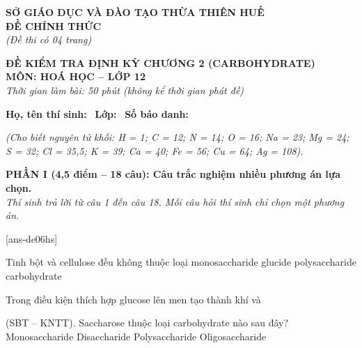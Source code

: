 \documentclass[12pt,a4paper]{article}
\begin{document}
\thispagestyle{firstpage}

\noindent
\begin{minipage}[t]{0.44\textwidth}
	\centering\fontsize{10pt}{12pt}\selectfont
	\textbf{SỞ GIÁO DỤC VÀ ĐÀO TẠO THỪA THIÊN HUẾ}\\
	\textbf{ĐỀ CHÍNH THỨC}\\
	\textit{(Đề thi có 04 trang)}
\end{minipage}\hfill
\begin{minipage}[t]{0.54\textwidth}
	\centering\small
	\textbf{ĐỀ KIỂM TRA ĐỊNH KỲ CHƯƠNG 2 (CARBOHYDRATE)}\\
	\textbf{MÔN: HOÁ HỌC -- LỚP 12}\\
	\textit{Thời gian làm bài: 50 phút (không kể thời gian phát đề)}\\
\end{minipage}

\smallskip
\noindent\hrulefill
\smallskip

\noindent\textbf{Họ, tên thí sinh:} \dotfill\ \textbf{Lớp:} \dotfill\ \textbf{Số báo danh:} \dotfill

\smallskip
\noindent\textit{(Cho biết nguyên tử khối: H = 1; C = 12; N = 14; O = 16; Na = 23; Mg = 24; S = 32; Cl = 35,5; K = 39; Ca = 40; Fe = 56; Cu = 64; Ag = 108).}

\vspace{0.15cm}
\noindent
\textbf{PHẦN I (4,5 điểm -- 18 câu): Câu trắc nghiệm nhiều phương án lựa chọn.}\\
\textit{Thí sinh trả lời từ câu 1 đến câu 18. Mỗi câu hỏi thí sinh chỉ chọn một phương án.}

[ans-de06hs]

\begin{ex}
Tinh bột và cellulose đều không thuộc loại
\choice
{monosaccharide}
{glucide}
{polysaccharide}
{carbohydrate}
\loigiai{}
\end{ex}

\begin{ex}
Trong điều kiện thích hợp glucose lên men tạo thành khí  và
\choice
{}
{}
{}
{}
\loigiai{}
\end{ex}

\begin{ex}
(SBT -- KNTT). Saccharose thuộc loại carbohydrate nào sau đây?
\choice
{Monosaccharide}
{Disaccharide}
{Polysaccharide}
{Oligosaccharide}
\loigiai{}
\end{ex}
\end{document}
